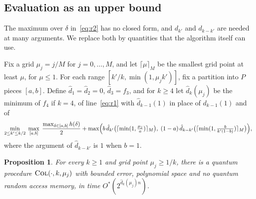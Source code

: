 \documentclass[11pt]{article}
\newtheorem{proposition}[theorem]{Proposition}
\theoremstyle{remark}
\newcommand{\COL}{\textup{\textsc{Col}}}
\begin{document}
\subsection{Evaluation as an upper bound}

The maximum over $\delta$ in~\eqref{eq:r2} has no closed form, and $d_{k'}$ and $d_{k-k'}$ are needed at many arguments. We replace both by quantities that the algorithm itself can use.

Fix a grid $\mu_j = j/M$ for $j = 0, \dots, M$, and let $\lceil\mu\rceil_M$ be the smallest grid point at least $\mu$, for $\mu \le 1$. For each range $[k'/k, \min(1, \mu_j k')]$, fix a partition into $P$ pieces $[a, b]$. Define $\hat d_1 = \hat d_2 = 0$, $\hat d_3 = f_3$, and for $k \ge 4$ let $\hat d_k(\mu_j)$ be the minimum of $f_4$ if $k = 4$, of line~\eqref{eq:r1} with $\hat d_{k-1}(1)$ in place of $d_{k-1}(1)$ and of
\begin{equation}\label{eq:hat}
\min_{2 \le k' \le k/2}\; \max_{[a,b]}\; \frac{\max_{\delta \in [a,b]} h(\delta)}{2} + \max\Bigl(b\, \hat d_{k'}\bigl(\lceil \min(1, \tfrac{\mu_j}{a}) \rceil_M\bigr),\; (1-a)\, \hat d_{k-k'}\bigl(\lceil \min(1, \tfrac{b}{k'(1-b)}) \rceil_M\bigr)\Bigr),
\end{equation}
where the argument of $\hat d_{k-k'}$ is $1$ when $b = 1$.

\begin{proposition}\label{prop:hat}
For every $k \ge 1$ and grid point $\mu_j \ge 1/k$, there is a quantum procedure $\COL(\cdot, k, \mu_j)$ with bounded error, polynomial space and no quantum random access memory, in time $O^*(2^{\hat d_k(\mu_j) n})$.
\end{proposition}
\end{document}
